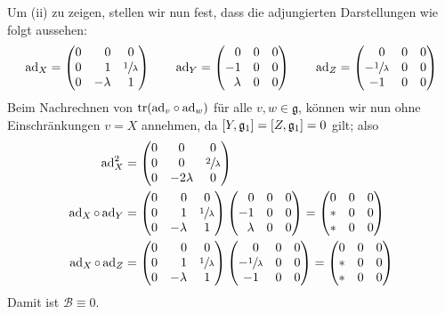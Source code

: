 \begin{beweis}
	Um (ii) zu zeigen, stellen wir nun fest, dass die adjungierten Darstellungen wie folgt aussehen:
	\[
		\ad_X = \begin{pmatrix*}[r]
			0 & 0 & 0\,\, \\
			0 & 1 & \sfrac{1}{\lambda} \\
			0 & -\lambda & 1\,\,
		\end{pmatrix*}
		\qquad 
		\ad_Y = \begin{pmatrix*}[r]
			0 & 0 & 0 \\
			-1 & 0 & 0 \\
			\lambda & 0 & 0
		\end{pmatrix*}
		\qquad 
		\ad_Z = \begin{pmatrix*}[r]
			0\,\, & 0 & 0 \\
			- \sfrac{1}{\lambda} & 0 & 0 \\
			-1\,\, & 0 & 0
		\end{pmatrix*}
	\]
	Beim Nachrechnen von $\tr \enbrace*{{\ad_v} \circ {\ad_w}}$ für alle $v,w \in \mathfrak{g}$, können wir nun ohne Einschränkungen $v=X$ annehmen, da $\benbrace*{Y,\mathfrak{g}_1} = \benbrace*{Z, \mathfrak{g}_1}=0$ gilt; also
	\begin{align}
		\ad_X^2 &= \begin{pmatrix}
			0 & 0 & 0 \\
			0 & 0 & \sfrac{2}{\lambda} \\
			0 & - 2 \lambda & 0
		\end{pmatrix} \\
		\ad_X \circ \ad_Y &= \begin{pmatrix*}[r]
			0 & 0 & 0\,\, \\
			0 & 1 & \sfrac{1}{\lambda} \\
			0 & -\lambda & 1\,\,
		\end{pmatrix*}
		\begin{pmatrix*}[r]
			0 & 0 & 0 \\
			-1 & 0 & 0 \\
			\lambda & 0 & 0
		\end{pmatrix*}
		= \begin{pmatrix}
			0 & 0 & 0 \\
			* & 0 & 0 \\
			* & 0 & 0
		\end{pmatrix} \\
		\ad_X \circ \ad_Z &= 
		\begin{pmatrix*}[r]
			0 & 0 & 0\,\, \\
			0 & 1 & \sfrac{1}{\lambda} \\
			0 & -\lambda & 1\,\,
		\end{pmatrix*}
		\begin{pmatrix*}[r]
			0\,\, & 0 & 0 \\
			- \sfrac{1}{\lambda} & 0 & 0 \\
			-1\,\, & 0 & 0
		\end{pmatrix*}
		= \begin{pmatrix}
			0 & 0 & 0 \\
			* & 0 & 0 \\
			* & 0 & 0
		\end{pmatrix}
	\end{align}
	Damit ist $\mathcal{B} \equiv 0$.
\end{beweis}












